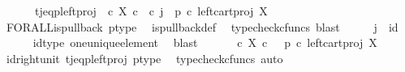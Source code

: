 \begin{isabellebody}
\ \ \ \ \ \ t{\isacharunderscore}{\kern0pt}j{\isacharunderscore}{\kern0pt}eq{\isacharunderscore}{\kern0pt}p{\isacharunderscore}{\kern0pt}left{\isacharunderscore}{\kern0pt}proj{\isacharcolon}{\kern0pt}\ {\isachardoublequoteopen}{\isacharparenleft}{\kern0pt}{\isasymt}\ {\isasymcirc}\isactrlsub c\ {\isasymbeta}\isactrlbsub X\ {\isasymtimes}\isactrlsub c\ {\isasymone}\isactrlesub {\isacharparenright}{\kern0pt}\isactrlsup {\isasymsharp}\ {\isasymcirc}\isactrlsub c\ j\ {\isacharequal}{\kern0pt}\ {\isacharparenleft}{\kern0pt}p\ {\isasymcirc}\isactrlsub c\ left{\isacharunderscore}{\kern0pt}cart{\isacharunderscore}{\kern0pt}proj\ X\ {\isasymone}{\isacharparenright}{\kern0pt}\isactrlsup {\isasymsharp}{\isachardoublequoteclose}\isanewline
\ \ \ \ \isamarkupfalse%
\ FORALL{\isacharunderscore}{\kern0pt}is{\isacharunderscore}{\kern0pt}pullback\ p{\isacharunderscore}{\kern0pt}type\ \isamarkupfalse%
\ is{\isacharunderscore}{\kern0pt}pullback{\isacharunderscore}{\kern0pt}def\ \isamarkupfalse%
\ {\isacharparenleft}{\kern0pt}typecheck{\isacharunderscore}{\kern0pt}cfuncs{\isacharcomma}{\kern0pt}\ blast{\isacharparenright}{\kern0pt}\isanewline
\ \ \isamarkupfalse%
\ \isamarkupfalse%
\ {\isachardoublequoteopen}j\ {\isacharequal}{\kern0pt}\ id\ {\isasymone}{\isachardoublequoteclose}\isanewline
\ \ \ \ \isamarkupfalse%
\ id{\isacharunderscore}{\kern0pt}type\ one{\isacharunderscore}{\kern0pt}unique{\isacharunderscore}{\kern0pt}element\ \isamarkupfalse%
\ blast\isanewline
\ \ \isamarkupfalse%
\ \isamarkupfalse%
\ {\isachardoublequoteopen}{\isacharparenleft}{\kern0pt}{\isasymt}\ {\isasymcirc}\isactrlsub c\ {\isasymbeta}\isactrlbsub X\ {\isasymtimes}\isactrlsub c\ {\isasymone}\isactrlesub {\isacharparenright}{\kern0pt}\isactrlsup {\isasymsharp}\ {\isacharequal}{\kern0pt}\ {\isacharparenleft}{\kern0pt}p\ {\isasymcirc}\isactrlsub c\ left{\isacharunderscore}{\kern0pt}cart{\isacharunderscore}{\kern0pt}proj\ X\ {\isasymone}{\isacharparenright}{\kern0pt}\isactrlsup {\isasymsharp}{\isachardoublequoteclose}\isanewline
\ \ \ \ \isamarkupfalse%
\ id{\isacharunderscore}{\kern0pt}right{\isacharunderscore}{\kern0pt}unit{}\ t{\isacharunderscore}{\kern0pt}j{\isacharunderscore}{\kern0pt}eq{\isacharunderscore}{\kern0pt}p{\isacharunderscore}{\kern0pt}left{\isacharunderscore}{\kern0pt}proj\ p{\isacharunderscore}{\kern0pt}type\ \isamarkupfalse%
\ {\isacharparenleft}{\kern0pt}typecheck{\isacharunderscore}{\kern0pt}cfuncs{\isacharcomma}{\kern0pt}\ auto{\isacharparenright}{\kern0pt}\isanewline

\end{isabellebody}
